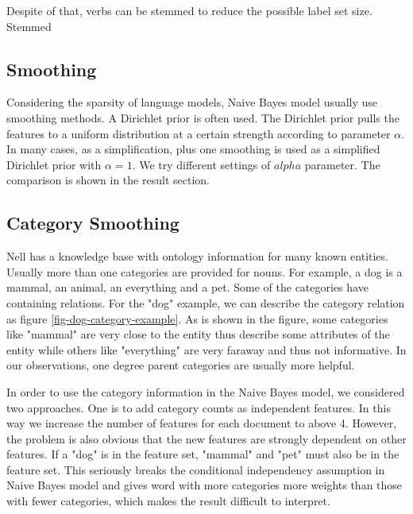 Despite of that, verbs can be stemmed to reduce the possible label set size. Stemmed 

\subsection{Smoothing}

Considering the sparsity of language models, Naive Bayes model usually use smoothing methods. A Dirichlet prior is often used. The Dirichlet prior pulls the features to a uniform distribution at a certain strength according to parameter $\alpha$. In many cases, as a simplification, plus one smoothing is used as a simplified Dirichlet prior with $\alpha=1$. We try different settings of $alpha$ parameter. The comparison is shown in the result section.

\subsection{Category Smoothing}

Nell has a knowledge base with ontology information for many known entities. Usually more than one categories are provided for nouns. For example, a dog is a mammal, an animal, an everything and a pet. Some of the categories have containing relations. For the "dog" example, we can describe the category relation as figure \ref{fig-dog-category-example}. As is shown in the figure, some categories like "mammal" are very close to the entity thus describe some attributes of the entity while others like "everything" are very faraway and thus not informative. In our observations, one degree parent categories are usually more helpful.


In order to use the category information in the Naive Bayes model, we considered two approaches. One is to add category counts as independent features. In this way we increase the number of features for each document to above 4. However, the problem is also obvious that the new features are strongly dependent on other features. If a "dog" is in the feature set, "mammal" and "pet" must also be in the feature set. This seriously breaks the conditional independency assumption in Naive Bayes model and gives word with more categories more weights than those with fewer categories, which makes the result difficult to interpret.


